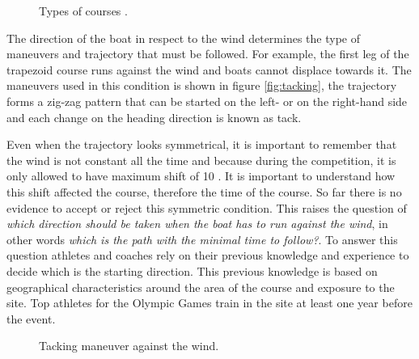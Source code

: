 \begin{figure}[ht]
  \centering
  \hfill
  \caption{Types of courses \cite{instr_rio}.}
\label{fig:typecourses} 
\end{figure}

The direction of the boat in respect to the wind determines the type of maneuvers and trajectory that must be followed. For example, the first leg of the trapezoid course runs against the wind and boats cannot displace towards it. The maneuvers used in this condition is shown in figure \ref{fig:tacking}, the trajectory forms a zig-zag pattern that can be started on the left- or on the right-hand side and each change on the heading direction is known as tack. \par 

Even when the trajectory looks symmetrical, it is important to remember that the wind is not constant all the time and because during the competition, it is only allowed to have maximum shift of 10 \degree \cite{race_pol}. It is important to understand how this shift affected the course, therefore the time of the course. So far there is no evidence to accept or reject this symmetric condition. This raises the question of \textit{which direction should be taken when the boat has to run against the wind}, in other words \textit{which is the path with the minimal time to follow?}. To answer this question athletes and coaches rely on their previous knowledge and experience to decide which is the starting direction. This previous knowledge is based on geographical characteristics around the area of the course and exposure to the site. Top athletes for the Olympic Games train in the site at least one year before the event.\par 
\begin{figure}[ht]
  \centering
  \hfill
   \centering
  \caption{Tacking maneuver against the wind.}
\label{fig:tack_against_wind} 
\end{figure}

